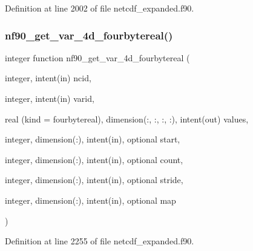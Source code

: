 Definition at line 2002 of file netcdf\+\_\+expanded.\+f90.

\mbox{\label{netcdf__expanded_8f90_af3359c354a26ee5e41cf214955c750a6}} 
\subsubsection{\texorpdfstring{nf90\+\_\+get\+\_\+var\+\_\+4d\+\_\+fourbytereal()}{nf90\_get\_var\_4d\_fourbytereal()}}
{\footnotesize\ttfamily integer function nf90\+\_\+get\+\_\+var\+\_\+4d\+\_\+fourbytereal (\begin{DoxyParamCaption}\item[{integer, intent(in)}]{ncid,  }\item[{integer, intent(in)}]{varid,  }\item[{real (kind = fourbytereal), dimension(\+:, \+:, \+:, \+:), intent(out)}]{values,  }\item[{integer, dimension(\+:), intent(in), optional}]{start,  }\item[{integer, dimension(\+:), intent(in), optional}]{count,  }\item[{integer, dimension(\+:), intent(in), optional}]{stride,  }\item[{integer, dimension(\+:), intent(in), optional}]{map }\end{DoxyParamCaption})}



Definition at line 2255 of file netcdf\+\_\+expanded.\+f90.

\mbox{\label{netcdf__expanded_8f90_aebd72fab68982abf0a39c99fd706ddc9}} 
